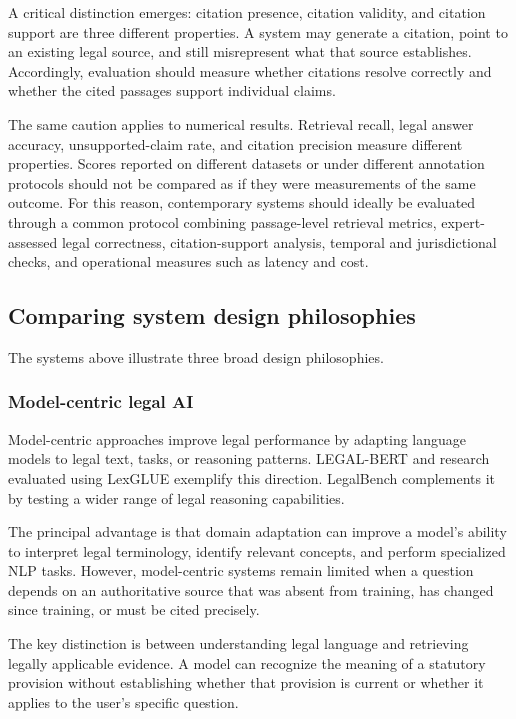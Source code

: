 A critical distinction emerges: citation presence, citation validity, and citation support are three
different properties. A system may generate a citation, point to an existing legal source, and still
misrepresent what that source establishes. Accordingly, evaluation should measure whether citations
resolve correctly and whether the cited passages support individual claims.

The same caution applies to numerical results. Retrieval recall, legal answer accuracy,
unsupported-claim rate, and citation precision measure different properties. Scores reported on
different datasets or under different annotation protocols should not be compared as if they were
measurements of the same outcome. For this reason, contemporary systems should ideally be evaluated
through a common protocol combining passage-level retrieval metrics, expert-assessed legal
correctness, citation-support analysis, temporal and jurisdictional checks, and operational measures
such as latency and cost.

\subsection{Comparing system design philosophies}

The systems above illustrate three broad design philosophies.

\subsubsection{Model-centric legal AI}

Model-centric approaches improve legal performance by adapting language models to legal text, tasks, or
reasoning patterns. LEGAL-BERT and research evaluated using LexGLUE exemplify this direction. LegalBench
complements it by testing a wider range of legal reasoning capabilities.

The principal advantage is that domain adaptation can improve a model's ability to interpret legal
terminology, identify relevant concepts, and perform specialized NLP tasks. However, model-centric
systems remain limited when a question depends on an authoritative source that was absent from training,
has changed since training, or must be cited precisely.

The key distinction is between understanding legal language and retrieving legally applicable evidence.
A model can recognize the meaning of a statutory provision without establishing whether that provision
is current or whether it applies to the user's specific question.

